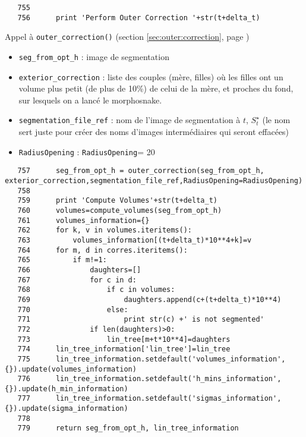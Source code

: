 \documentclass{article}
\def \mycolor {red}
\begin{document}
\color{black}
\begin{verbatim}
   755	
   756	    print 'Perform Outer Correction '+str(t+delta_t)
\end{verbatim}
\color{\mycolor}
Appel \`a \texttt{outer\_correction()}
(section \ref{sec:outer:correction}, page \pageref{sec:outer:correction})
\begin{itemize}
\itemsep -0.5ex
\item \verb|seg_from_opt_h| : image de segmentation
\item \verb|exterior_correction| : liste des couples (m\`ere, filles) o\`u les filles ont un volume plus petit (de plus de 10\%) de celui de la m\`ere, et proches du fond, sur lesquels on a lanc\'e le morphosnake.
\item \verb|segmentation_file_ref| : nom de l'image de segmentation \`a $t$, $S^{\star}_t$ (le nom sert juste pour cr\'eer des noms d'images interm\'ediaires qui seront effac\'ees)
\item \verb|RadiusOpening| : \verb|RadiusOpening|= 20
\end{itemize}
\color{black}
\begin{verbatim}
   757	    seg_from_opt_h = outer_correction(seg_from_opt_h, exterior_correction,segmentation_file_ref,RadiusOpening=RadiusOpening)
   758	
   759	    print 'Compute Volumes'+str(t+delta_t)
   760	    volumes=compute_volumes(seg_from_opt_h)
   761	    volumes_information={}
   762	    for k, v in volumes.iteritems():
   763	        volumes_information[(t+delta_t)*10**4+k]=v
   764	    for m, d in corres.iteritems():
   765	        if m!=1:
   766	            daughters=[]
   767	            for c in d:
   768	                if c in volumes:
   769	                    daughters.append(c+(t+delta_t)*10**4)
   770	                else:
   771	                    print str(c) +' is not segmented'
   772	            if len(daughters)>0:
   773	                lin_tree[m+t*10**4]=daughters
   774	    lin_tree_information['lin_tree']=lin_tree
   775	    lin_tree_information.setdefault('volumes_information', {}).update(volumes_information)
   776	    lin_tree_information.setdefault('h_mins_information', {}).update(h_min_information)
   777	    lin_tree_information.setdefault('sigmas_information', {}).update(sigma_information)
   778	
   779	    return seg_from_opt_h, lin_tree_information
\end{verbatim}
\end{document}
